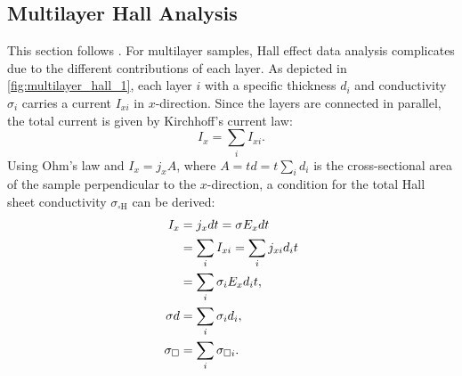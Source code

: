 \subsection{ Multilayer Hall Analysis}
This section follows .
For multilayer samples, Hall effect data analysis complicates due to the different
contributions of each layer.
As depicted in \cref{fig:multilayer_hall_1}, each layer $i$ with a specific thickness 
$d_i$ and conductivity $\sigma_i$ carries a current $I_{xi}$ in $x$-direction.
Since the layers are connected in parallel, the total current is 
given by Kirchhoff's current law:
\begin{equation}
	I_x = \sum_i I_{xi}.
\end{equation}
Using Ohm's law and $I_x=j_x A$, where $A=t d = t \sum_i d_i$ is the cross-sectional area of 
the sample perpendicular to the $x$-direction, a condition for the total Hall sheet 
conductivity $\sigma_\mathrm{\square H}$ can be derived:
\begin{align}
	I_{x}&=j_{x}dt=\sigma E_{x} dt \notag\\
	&=\sum_{i}I_{x i}=\sum_{i}j_{x i} d_{i}t \notag\\
	&=\sum_{i}\sigma_{i} E_{x}d_{i}t, \\
	\sigma d&=\sum_{i}\sigma_{i}d_{i}, \\
	\sigma_{\mathrm{\square}}&=\sum_{i} \sigma_{\square i}.
	\label{eq:multilayer_sum_1}
\end{align}

